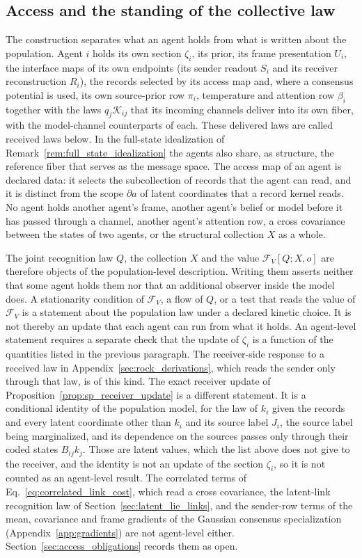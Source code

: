 \subsection{Access and the standing of the collective law}\label{sec:access_convention}
The construction separates what an agent holds from what is written about the population. Agent $i$ holds its own section $\zeta_i$, its prior, its frame presentation $U_i$, the interface maps of its own endpoints (its sender readout $S_i$ and its receiver reconstruction $R_i$), the records selected by its access map and, where a consensus potential is used, its own source-prior row $\pi_i$, temperature and attention row $\beta_i$ together with the laws $q_j\mathcal K_{ij}$ that its incoming channels deliver into its own fiber, with the model-channel counterparts of each. These delivered laws are called received laws below. In the full-state idealization of Remark~\ref{rem:full_state_idealization} the agents also share, as structure, the reference fiber that serves as the message space. The access map of an agent is declared data: it selects the subcollection of records that the agent can read, and it is distinct from the scope $\partial a$ of latent coordinates that a record kernel reads. No agent holds another agent's frame, another agent's belief or model before it has passed through a channel, another agent's attention row, a cross covariance between the states of two agents, or the structural collection $X$ as a whole.

The joint recognition law $Q$, the collection $X$ and the value $\mathcal F_V[Q;X,o]$ are therefore objects of the population-level description. Writing them asserts neither that some agent holds them nor that an additional observer inside the model does. A stationarity condition of $\mathcal F_V$, a flow of $Q$, or a test that reads the value of $\mathcal F_V$ is a statement about the population law under a declared kinetic choice. It is not thereby an update that each agent can run from what it holds. An agent-level statement requires a separate check that the update of $\zeta_i$ is a function of the quantities listed in the previous paragraph. The receiver-side response to a received law in Appendix~\ref{sec:rock_derivations}, which reads the sender only through that law, is of this kind. The exact receiver update of Proposition~\ref{prop:sp_receiver_update} is a different statement. It is a conditional identity of the population model, for the law of $k_i$ given the records and every latent coordinate other than $k_i$ and its source label $J_i$, the source label being marginalized, and its dependence on the sources passes only through their coded states $B_{ij}k_j$. Those are latent values, which the list above does not give to the receiver, and the identity is not an update of the section $\zeta_i$, so it is not counted as an agent-level result. The correlated terms of Eq.~\eqref{eq:correlated_link_cost}, which read a cross covariance, the latent-link recognition law of Section~\ref{sec:latent_lie_links}, and the sender-row terms of the mean, covariance and frame gradients of the Gaussian consensus specialization (Appendix~\ref{app:gradients}) are not agent-level either. Section~\ref{sec:access_obligations} records them as open.

